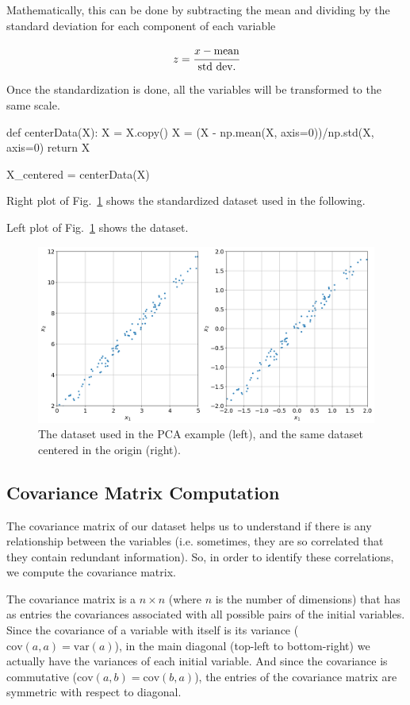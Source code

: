 Mathematically, this can be done by subtracting the mean and dividing by the standard deviation for each component of each variable

\begin{equation}
z = \cfrac{x - \textrm{mean}}{\textrm{std dev.}}
\end{equation}

Once the standardization is done, all the variables will be transformed to the same scale.

\begin{ipython}
def centerData(X):
    X = X.copy()
    X = (X - np.mean(X, axis=0))/np.std(X, axis=0)
    return X
    
X_centered = centerData(X)
\end{ipython}

Right plot of Fig.~\ref{fig:pca_dataset} shows the standardized dataset used in the following.

Left plot of Fig.~\ref{fig:pca_dataset} shows the dataset.
\begin{figure}[htb]
	\centering
	\includegraphics[width=0.9\linewidth]{figures/pca_dataset_both}
	\caption{The dataset used in the PCA example (left), and the same dataset centered in the origin (right).}
	\label{fig:pca_dataset}
\end{figure}

\subsection{Covariance Matrix Computation}
The covariance matrix of our dataset helps us to understand if there is any relationship between the variables (i.e. sometimes, they are so correlated that they contain redundant information). So, in order to identify these correlations, we compute the covariance matrix.

The covariance matrix is a $n\times n$ (where $n$ is the number of dimensions) that has as entries the covariances associated with all possible pairs of the initial variables. Since the covariance of a variable with itself is its variance ($\textrm{cov}(a, a)= \textrm{var}(a)$), in the main diagonal (top-left to bottom-right) we actually have the variances of each initial variable. And since the covariance is commutative ($\textrm{cov}(a, b) = \textrm{cov}(b, a)$), the entries of the covariance matrix are symmetric with respect to diagonal.

